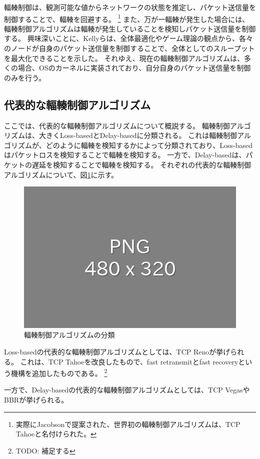 \documentclass[a4paper,11pt]{jreport}
\newcommand{\figref}[1]{図\ref{#1}}
\begin{document}
輻輳制御\cite{congestion-avoidance}は、観測可能な値からネットワークの状態を推定し、パケット送信量を制御することで、輻輳を回避する。
\footnote{実際にJacobson\cite{congestion-avoidance}で提案された、世界初の輻輳制御アルゴリズムは、TCP Tahoeと名付けられた。}
また、万が一輻輳が発生した場合には、輻輳制御アルゴリズムは輻輳が発生していることを検知しパケット送信量を制御する。
興味深いことに、Kellyら\cite{kelly1998rate}は、全体最適化やゲーム理論の観点から、各々のノードが自身のパケット送信量を制御することで、全体としてのスループットを最大化できることを示した。
それゆえ、現在の輻輳制御アルゴリズムは、多くの場合、OSのカーネルに実装されており、自分自身のパケット送信量を制御のみを行う。

\subsection{代表的な輻輳制御アルゴリズム}

ここでは、代表的な輻輳制御アルゴリズムについて概説する。
輻輳制御アルゴリズムは、大きくLoss-basedとDelay-basedに分類される。
これは輻輳制御アルゴリズムが、どのように輻輳を検知するかによって分類されており、Loss-basedはパケットロスを検知することで輻輳を検知する。
一方で、Delay-basedは、パケットの遅延を検知することで輻輳を検知する。
それぞれの代表的な輻輳制御アルゴリズムについて、\figref{figure:congestion_control_classification}に示す。

\begin{figure}[htbp]
  \centering
  \includegraphics[width=0.6\linewidth]{fig/chap02/empty.png}
  \caption{輻輳制御アルゴリズムの分類}
  \label{figure:congestion_control_classification}
\end{figure}

Loss-basedの代表的な輻輳制御アルゴリズムとしては、TCP Reno\cite{reno,tcp}が挙げられる。
これは、TCP Tahoe\cite{congestion-avoidance}を改良したもので、fast retransmitとfast recoveryという機構を追加したものである。
\footnote{TODO: 補足する}

一方で、Delay-basedの代表的な輻輳制御アルゴリズムとしては、TCP Vegas\cite{tcp-vegas}やBBR\cite{bbr}が挙げられる。
\end{document}
